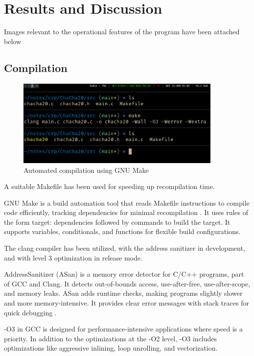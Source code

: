 \documentclass[a4paper,12pt]{report}
\begin{document}
\chapter{Results and Discussion}
Images relevant to the operational features of the program have been attached below

\section{Compilation}
\begin{figure}[h]
	\centering
	\includegraphics[width=0.9\textwidth]{../assets/1_make.png}
        \caption{Automated compilation using GNU Make}
	\label{image}
\end{figure}

A suitable Makefile has been used for speeding up recompilation time.

GNU Make is a build automation tool that reads Makefile instructions to compile code efficiently, tracking dependencies for minimal recompilation \cite{gnu_make}.
It uses rules of the form target: dependencies followed by commands to build the target.
It supports variables, conditionals, and functions for flexible build configurations.

The clang compiler has been utilized, with the address sanitizer in development, and with level 3 optimization in release mode. \cite{clang_manual}

AddressSanitizer (ASan) is a memory error detector for C/C++ programs, part of GCC and Clang. It detects out-of-bounds access, use-after-free, use-after-scope, and memory leaks.
ASan adds runtime checks, making programs slightly slower and more memory-intensive. It provides clear error messages with stack traces for quick debugging \cite{clang_address_sanitizer}.

-O3 in GCC is designed for performance-intensive applications where speed is a priority.
In addition to the optimizations at the -O2 level, -O3 includes optimizations like aggressive inlining, loop unrolling, and vectorization.
\end{document}
